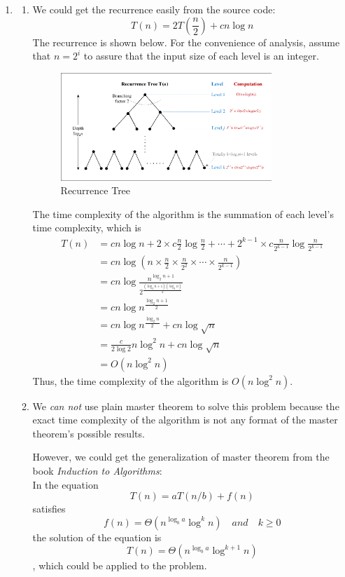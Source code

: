 \documentclass[12pt,a4paper]{article}
\makeatletter
\newtheorem*{solution}{Solution}
\theoremstyle{definition}
\renewenvironment{solution}[1][Solution] {\par\pushQED{\qed}\normalfont\topsep6\p@\@plus6\p@\relax\trivlist\item[\hskip\labelsep\bfseries#1\@addpunct{.}]\ignorespaces}{\popQED\endtrivlist\@endpefalse} \makeatother
\makeatother
\begin{document}
\begin{enumerate}
\begin{solution}
\begin{enumerate}
\item We could get the recurrence easily from the source code:
$$T(n)=2T(\frac{n}{2})+cn\log n$$
The recurrence is shown below. For the convenience of analysis, assume that $n=2^i$ to assure that the input size of each level is an integer. 

\begin{figure}[htbp]
    \centering
    \includegraphics[width=0.8\textwidth]{Fig-RecurrenceTree.pdf}
    \caption{Recurrence Tree}\label{Fig-RecurrenceTree}
\end{figure}

The time complexity of the algorithm is the summation of each level's time complexity, which is 
\begin{equation}
\begin{split}
T(n)&=cn\log n+ 2\times c\frac{n}{2} \log \frac{n}{2}+\cdots +2^{k-1}\times c\frac{n}{2^{k-1}}\log \frac{n}{2^{k-1}}\\
&=cn \log( n \times \frac{n}{2} \times \frac{n}{2^2} \times \cdots\times\frac{n}{2^{k-1}})\\
&=cn\log \frac{n^{\log_2 n+1}}{2^{\frac{(\log_2 n+1)(\log_2 n)}{2}}}\\
&=cn\log n^{\frac{\log_2 n+1}{2}}\\
&=cn\log n^{\frac{\log_2 n}{2}}+cn\log \sqrt{n}\\
&=\frac{c}{2\log 2}n \log^2 n+cn\log\sqrt{n}\\
&=O(n\log^2 n)
\end{split}
\end{equation}
Thus, the time complexity of the algorithm is $O(n\log^2 n)$.

\item We \emph{can not} use plain master theorem to solve this problem because the exact time complexity of the algorithm is not any format of the master theorem's possible results.

However, we could get the generalization of master theorem from the book \textit{Induction to Algorithms}:\\
In the equation $$T(n)=aT(n/b)+f(n)$$ satisfies 
$$f(n)=\Theta(n^{\log_b a}\log^k n)\quad and\quad k\geq 0$$
the solution of the equation is $$T(n)=\Theta(n^{\log_b a}\log^{k+1} n)$$, which could be applied to the problem.


\end{enumerate}
\end{solution}
\end{enumerate}
\end{document}
